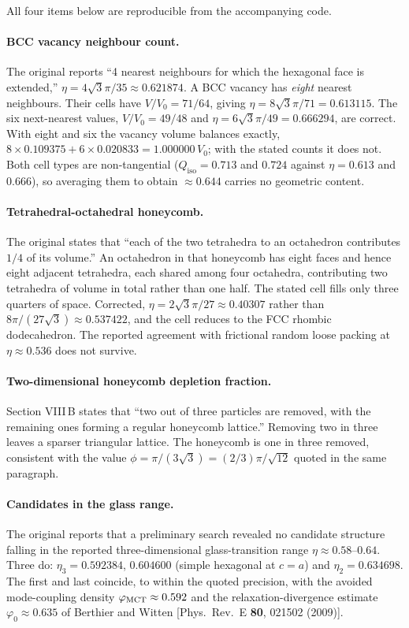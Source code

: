 \documentclass[11pt]{article}
\begin{document}
All four items below are reproducible from the accompanying code.

\paragraph{BCC vacancy neighbour count.} The original reports ``4 nearest
neighbours for which the hexagonal face is extended,''
$\eta=4\sqrt3\pi/35\approx0.621874$. A BCC vacancy has \emph{eight} nearest
neighbours. Their cells have $V/V_0=71/64$, giving
$\eta = 8\sqrt3\pi/71 = 0.613115$. The six next-nearest values,
$V/V_0=49/48$ and $\eta=6\sqrt3\pi/49=0.666294$, are correct. With eight and six
the vacancy volume balances exactly,
$8\times0.109375 + 6\times0.020833 = 1.000000\,V_0$; with the stated counts it
does not. Both cell types are non-tangential ($Q_{\mathrm{iso}}=0.713$ and
$0.724$ against $\eta=0.613$ and $0.666$), so averaging them to obtain
$\approx0.644$ carries no geometric content.

\paragraph{Tetrahedral-octahedral honeycomb.} The original states that ``each of
the two tetrahedra to an octahedron contributes $1/4$ of its volume.'' An
octahedron in that honeycomb has eight faces and hence eight adjacent tetrahedra,
each shared among four octahedra, contributing two tetrahedra of volume in total
rather than one half. The stated cell fills only three quarters of space.
Corrected, $\eta = 2\sqrt3\pi/27 \approx 0.40307$ rather than
$8\pi/(27\sqrt3)\approx0.537422$, and the cell reduces to the FCC rhombic
dodecahedron. The reported agreement with frictional random loose packing at
$\eta\approx0.536$ does not survive.

\paragraph{Two-dimensional honeycomb depletion fraction.} Section VIII\,B states
that ``two out of three particles are removed, with the remaining ones forming a
regular honeycomb lattice.'' Removing two in three leaves a sparser triangular
lattice. The honeycomb is one in three removed, consistent with the value
$\phi=\pi/(3\sqrt3)=(2/3)\pi/\sqrt{12}$ quoted in the same paragraph.

\paragraph{Candidates in the glass range.} The original reports that a
preliminary search revealed no candidate structure falling in the reported
three-dimensional glass-transition range $\eta\approx0.58$--$0.64$. Three do: $\eta_3=0.592384$, $0.604600$ (simple hexagonal at $c=a$) and
$\eta_2=0.634698$. The first and last coincide, to within the quoted precision,
with the avoided mode-coupling density $\varphi_{\rm MCT}\approx0.592$ and the
relaxation-divergence estimate $\varphi_0\approx0.635$ of Berthier and Witten
[Phys.\ Rev.\ E \textbf{80}, 021502 (2009)].
\end{document}
